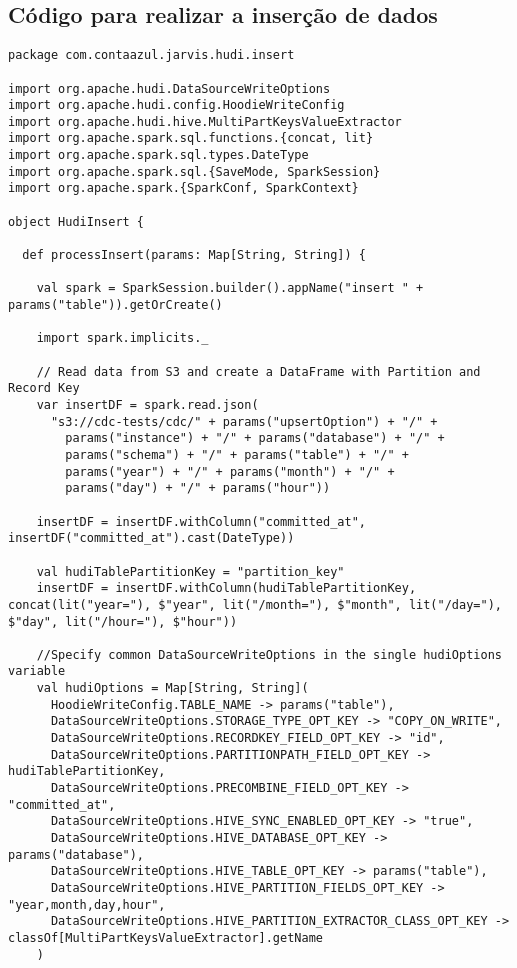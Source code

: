 \documentclass[12pt, oneside, a4paper, brazil]{abntex2}
\begin{document}
 \let\tccaddcontentsline\addcontentsline
\renewcommand\addcontentsline[3]{
  \ifthenelse{\equal{#1}{lof}}{} {
    \ifthenelse{\equal{#1}{lot}}{}{\tccaddcontentsline{#1}{#2}{#3}}
  }
}
\begin{apendicesenv}

\partapendices

\chapter{Código para realizar a inserção de dados} \label{apendice}

\begin{lstlisting}
package com.contaazul.jarvis.hudi.insert

import org.apache.hudi.DataSourceWriteOptions
import org.apache.hudi.config.HoodieWriteConfig
import org.apache.hudi.hive.MultiPartKeysValueExtractor
import org.apache.spark.sql.functions.{concat, lit}
import org.apache.spark.sql.types.DateType
import org.apache.spark.sql.{SaveMode, SparkSession}
import org.apache.spark.{SparkConf, SparkContext}

object HudiInsert {

  def processInsert(params: Map[String, String]) {

    val spark = SparkSession.builder().appName("insert " + params("table")).getOrCreate()

    import spark.implicits._

    // Read data from S3 and create a DataFrame with Partition and Record Key
    var insertDF = spark.read.json(
      "s3://cdc-tests/cdc/" + params("upsertOption") + "/" +
        params("instance") + "/" + params("database") + "/" +
        params("schema") + "/" + params("table") + "/" +
        params("year") + "/" + params("month") + "/" +
        params("day") + "/" + params("hour"))

    insertDF = insertDF.withColumn("committed_at", insertDF("committed_at").cast(DateType))

    val hudiTablePartitionKey = "partition_key"
    insertDF = insertDF.withColumn(hudiTablePartitionKey, concat(lit("year="), $"year", lit("/month="), $"month", lit("/day="), $"day", lit("/hour="), $"hour"))

    //Specify common DataSourceWriteOptions in the single hudiOptions variable
    val hudiOptions = Map[String, String](
      HoodieWriteConfig.TABLE_NAME -> params("table"),
      DataSourceWriteOptions.STORAGE_TYPE_OPT_KEY -> "COPY_ON_WRITE",
      DataSourceWriteOptions.RECORDKEY_FIELD_OPT_KEY -> "id",
      DataSourceWriteOptions.PARTITIONPATH_FIELD_OPT_KEY -> hudiTablePartitionKey,
      DataSourceWriteOptions.PRECOMBINE_FIELD_OPT_KEY -> "committed_at",
      DataSourceWriteOptions.HIVE_SYNC_ENABLED_OPT_KEY -> "true",
      DataSourceWriteOptions.HIVE_DATABASE_OPT_KEY -> params("database"),
      DataSourceWriteOptions.HIVE_TABLE_OPT_KEY -> params("table"),
      DataSourceWriteOptions.HIVE_PARTITION_FIELDS_OPT_KEY -> "year,month,day,hour",
      DataSourceWriteOptions.HIVE_PARTITION_EXTRACTOR_CLASS_OPT_KEY -> classOf[MultiPartKeysValueExtractor].getName
    )


\end{lstlisting}
\end{apendicesenv}
\end{document}
